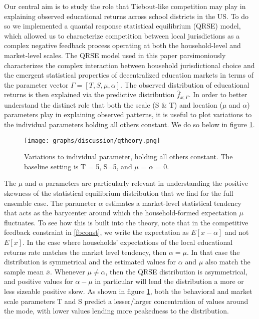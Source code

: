 \begin{table}[htbp]
{Our central aim is to study the role that Tiebout-like competition may
play in explaining observed educational returns across school
districts in the US. To do so we implemented a quantal response
statistical equilibrium (QRSE) model, which allowed us to characterize
competition between local jurisdictions as a complex negative feedback
process operating at both the household-level and market-level
scales. The QRSE model used in this paper parsimoniously characterizes
the complex interaction between household jurisdictional choice and
the emergent statistical properties of decentralized education markets
in terms of the parameter vector $\Gamma = [T,S, \mu, \alpha]$. The
observed distribution of educational returns is then explained via the
predictive distribution $\hat{f}_{x; \Gamma}$. In order to better understand the distinct role that both the scale (S
\& T) and location ($\mu$ and $\alpha$) parameters play in explaining
observed patterns, it is useful to plot variations to the individual
parameters holding all others constant. We do so below in figure
\ref{thplots}.

\begin{figure}[htb]
\centering
\texttt{[image: graphs/discussion/qtheory.png]}
\caption{\label{thplots}Variations to individual parameter, holding all others constant. The baseline setting is T = 5, S=5, and $\mu$ = $\alpha$ = 0.}
\end{figure}


The $\mu$ and $\alpha$ parameters are particularly relevant in understanding the positive
skewness of the statistical equilibrium distribution that we find for
the full ensemble case. The parameter $\alpha$ estimates a market-level
statistical tendency that acts as the barycenter around which the
household-formed expectation $\mu$ fluctuates. To see how this is
built into the theory, note that in the competitive feedback
constraint in \ref{fbconst}, we write the expectation as $E[x-\alpha]$
and not $E[x]$. In the case where households' expectations of the
local educational returns rate matches the market level tendency, then
$\alpha = \mu$. In that case the distribution is symmetrical and the
estimated values for $\alpha$ and $\mu$ also match the sample mean
$\bar{x}$. Whenever $\mu \neq \alpha$, then the QRSE distribution is
asymmetrical, and positive values for $\alpha - \mu$ in particular
will lend the distribution a more or less sizeable positive skew.
As shown in figure \ref{thplots}, both the behavioral and market scale
parameters T and S predict a lesser/larger concentration of values
around the mode, with lower values lending more peakedness to the
distribution. 

}
\end{table}
